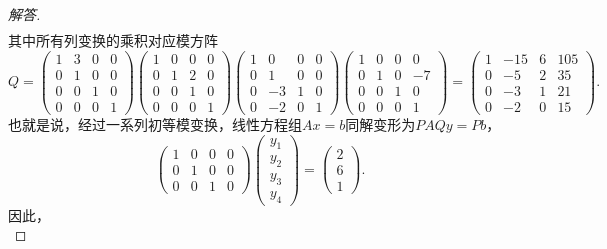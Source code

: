 \documentclass[a4paper,fontset=windows]{ctexbook}
\theoremstyle{definition}
\begin{document}
\begin{proof}[解答]
\begin{align*}
\end{align*}
其中所有列变换的乘积对应模方阵
$$Q=\begin{pmatrix}1&3&0&0 \\ 0&1&0&0 \\ 0&0&1&0 \\ 0&0&0&1\end{pmatrix}\begin{pmatrix}1&0&0&0 \\ 0&1&2&0 \\ 0&0&1&0 \\ 0&0&0&1\end{pmatrix}\begin{pmatrix}1&0&0&0 \\ 0&1&0&0 \\ 0&-3&1&0 \\ 0&-2&0&1\end{pmatrix}\begin{pmatrix}1&0&0&0 \\ 0&1&0&-7 \\ 0&0&1&0\\ 0&0&0&1\end{pmatrix}=\begin{pmatrix}1&-15&6&105 \\ 0&-5&2&35 \\ 0&-3&1&21 \\ 0&-2&0&15\end{pmatrix}.$$
也就是说，经过一系列初等模变换，线性方程组$Ax=b$同解变形为$PAQy=Pb$，
$$\begin{pmatrix}1&0&0&0 \\ 0&1&0&0 \\ 0&0&1&0\end{pmatrix}\begin{pmatrix}y_1 \\ y_2 \\ y_3 \\ y_4\end{pmatrix}=\begin{pmatrix}2 \\ 6 \\ 1\end{pmatrix}.$$
因此，
\begin{equation*}

\end{equation*}
\end{proof}
\end{document}
